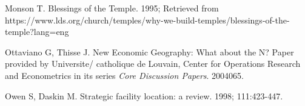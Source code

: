 \documentclass[twoside,twocolumn]{article}
\begin{document}
\begin{thebibliography}{99}
Monson T.
\newblock Blessings of the Temple. 1995;
\newblock Retrieved from https://www.lds.org/church/temples/why-we-build-temples/blessings-of-the-temple?lang=eng

Ottaviano G, Thisse J.
\newblock New Economic Geography: What about the N?
\newblock Paper provided by Universite/ catholique de Louvain, Center for Operations Research and Econometrics in its series {\em Core Discussion Papers}. 2004065.

Owen S, Daskin M.
\newblock Strategic facility location: a review.
 1998; 111:423-447.


\end{thebibliography}

\end{document}
